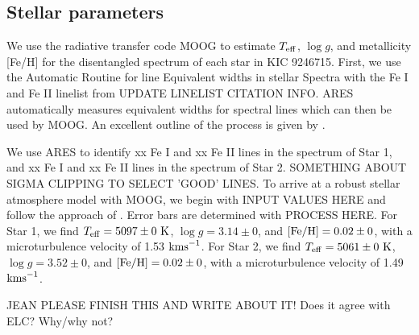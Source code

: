 \subsection{Stellar parameters}\label{parameters}
We use the radiative transfer code MOOG \citep{sne73} to estimate $T_{\rm{eff}}$, $\log g$, and metallicity [Fe/H] for the disentangled spectrum of each star in KIC 9246715. First, we use the Automatic Routine for line Equivalent widths in stellar Spectra \citep[ARES,][]{Sousa_2007} with the Fe I and Fe II linelist from \citet{Yong_2005} UPDATE LINELIST CITATION INFO. ARES automatically measures equivalent widths for spectral lines which can then be used by MOOG. An excellent outline of the process is given by \citet{Sousa_2014}.

We use ARES to identify xx Fe I and xx Fe II lines in the spectrum of Star 1, and xx Fe I and xx Fe II lines in the spectrum of Star 2. SOMETHING ABOUT SIGMA CLIPPING TO SELECT 'GOOD' LINES. To arrive at a robust stellar atmosphere model with MOOG, we begin with INPUT VALUES HERE and follow the approach of \citet{Mag13}. Error bars are determined with PROCESS HERE. For Star 1, we find $T_{\rm{eff}} = 5097 \pm 0 \ \rm{K}$, $\log g = 3.14 \pm 0$, and $\rm{[Fe/H]} = 0.02 \pm 0$, with a microturbulence velocity of 1.53 $\rm{km s}^{-1}$. For Star 2, we find $T_{\rm{eff}} = 5061 \pm 0 \ \rm{K}$, $\log g = 3.52 \pm 0$, and $\rm{[Fe/H]} = 0.02 \pm 0$, with a microturbulence velocity of 1.49 $\rm{km s}^{-1}$.

JEAN PLEASE FINISH THIS AND WRITE ABOUT IT! Does it agree with ELC? Why/why not?
    